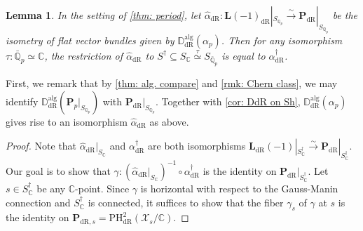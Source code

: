 \documentclass[11pt, letterpaper]{amsart}
\theoremstyle{plain}
\newtheorem{lemma}[theorem]{Lemma}
\theoremstyle{definition}
\newcommand{\IC}{\mathbb{C}}
\newcommand{\ID}{\mathbb{D}}
\newcommand{\IQ}{\mathbb{Q}}
\newcommand{\<}{\langle}
\renewcommand{\>}{\rangle}
\newcommand{\sX}{\mathcal{X}}
\newcommand{\bL}{\mathbf{L}}
\newcommand{\PH}{\mathrm{PH}}
\newcommand{\bP}{\mathbf{P}}
\newcommand{\dR}{\mathrm{dR}}
\newcommand{\sto}{\stackrel{\sim}{\to}}
\newcommand{\alg}{{\mathrm{alg}}}
\begin{document}
\begin{lemma}
\label{lem: alpha is de Rham}
    In the setting of \cref{thm: period}, let $\hat{\alpha}_\dR : \bL(-1)_\dR|_{S_{\IQ_p}} \sto \bP_{\dR}|_{S_{\IQ_p}}$ be the isometry
    of flat vector bundles given by $\ID^{\alg}_\dR(\alpha_p)$. 
    Then for any isomorphism $\tau : \bar{\IQ}_p \simeq \IC$, the restriction of $\hat{\alpha}_\dR$ to $S^\dagger \subseteq S_\IC \stackrel{\tau}{\simeq} S_{\bar{\IQ}_p}$ is equal to $\alpha^\dagger_{\dR}$. 
\end{lemma}
First, we remark that by \cref{thm: alg. compare} and \cref{rmk: Chern class}, we may identify $\ID^{\mathrm{alg}}_\dR(\bP_p|_{S_{\IQ_p}})$ with $\bP_\dR |_{S_{\IQ_p}}$. Together with \cref{cor: DdR on Sh}, $\ID^{\alg}_\dR(\alpha_p)$ gives rise to an isomorphism $\hat{\alpha}_\dR$ as above. 
\begin{proof}
    Note that $\hat{\alpha}_\dR|_{S_\IC}$ and $\alpha^\dagger_\dR$ are both isomorphisms $\bL_\dR (-1) |_{S^\dagger_\IC} \sto \bP_\dR |_{S^\dagger_\IC}$. 
    Our goal is to show that $\gamma : (\hat{\alpha}_\dR|_{S_\IC})^{-1} \circ \alpha^\dagger_\dR$ is the identity on $\bP_{\dR}|_{S^\dagger_\IC}$. Let $s \in S^\dagger_\IC$ be any $\IC$-point. 
    Since $\gamma$ is horizontal with respect to the Gauss-Manin connection and $S^\dagger_\IC$ is connected, it suffices to show that the fiber $\gamma_s$ of $\gamma$ at $s$ is the identity on $\bP_{\dR, s} = \PH^2_\dR(\sX_s/\IC)$. 


\end{proof}
\end{document}
